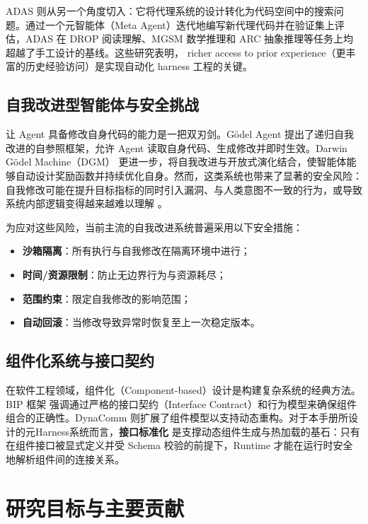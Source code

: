 ADAS \cite{hu2025adas} 则从另一个角度切入：它将代理系统的设计转化为代码空间中的搜索问题。通过一个元智能体（Meta Agent）迭代地编写新代理代码并在验证集上评估，ADAS 在 DROP 阅读理解、MGSM 数学推理和 ARC 抽象推理等任务上均超越了手工设计的基线。这些研究表明， richer access to prior experience（更丰富的历史经验访问）是实现自动化 harness 工程的关键。

\subsection{自我改进型智能体与安全挑战}

让 Agent 具备修改自身代码的能力是一把双刃剑。Gödel Agent \cite{godelagent2024} 提出了递归自我改进的自参照框架，允许 Agent 读取自身代码、生成修改并即时生效。Darwin Gödel Machine（DGM）\cite{dgm2025} 更进一步，将自我改进与开放式演化结合，使智能体能够自动设计奖励函数并持续优化自身。然而，这类系统也带来了显著的安全风险：自我修改可能在提升目标指标的同时引入漏洞、与人类意图不一致的行为，或导致系统内部逻辑变得越来越难以理解 \cite{hyperagents2026}。

为应对这些风险，当前主流的自我改进系统普遍采用以下安全措施：
\begin{itemize}
    \item \textbf{沙箱隔离}：所有执行与自我修改在隔离环境中进行；
    \item \textbf{时间/资源限制}：防止无边界行为与资源耗尽；
    \item \textbf{范围约束}：限定自我修改的影响范围；
    \item \textbf{自动回滚}：当修改导致异常时恢复至上一次稳定版本。
\end{itemize}

\subsection{组件化系统与接口契约}

在软件工程领域，组件化（Component-based）设计是构建复杂系统的经典方法。BIP 框架 \cite{bip2011} 强调通过严格的接口契约（Interface Contract）和行为模型来确保组件组合的正确性。DynaComm \cite{dynacomm2007} 则扩展了组件模型以支持动态重构。对于本手册所设计的元Harness系统而言，\textbf{接口标准化} 是支撑动态组件生成与热加载的基石：只有在组件接口被显式定义并受 Schema 校验的前提下，Runtime 才能在运行时安全地解析组件间的连接关系。

\section{研究目标与主要贡献}

